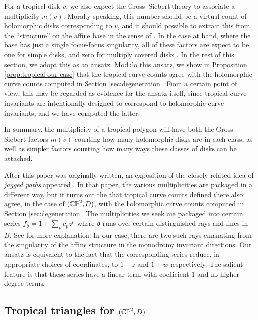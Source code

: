 \documentclass[12pt]{amsart}
\begin{document}
For a tropical disk $v$, we also expect the Gross--Siebert theory
to associate a multiplicity $m(v)$. Morally speaking, this number should be a virtual count of
holomorphic disks corresponding to $v$, and it should possible to extract this from the ``structure'' on the affine base in the sense of \cite{gs-affine-complex}. In the case at hand, where the base has just a single focus-focus singularity, all of these factors are expect to be one for simple disks, and zero for multiply covered disks \cite{abouzaid-comm}. In the rest of this section, we adopt this as an ansatz. Modulo this ansatz, we show in Proposition \ref{prop:tropical-our-case} that the tropical curve counts agree with the holomorphic curve counts computed in Section \ref{sec:degeneration}. From a certain point of view, this may be regarded as evidence for the ansatz itself, since tropical curve invariants are intentionally designed to correspond to holomorphic curve invariants, and we have computed the latter.

In summary, the multiplicity of a tropical polygon will have both the
Gross--Siebert factors $m(v)$ counting how many holomorphic disks are
in each class, as well as simpler factors counting how many ways these
classes of disks can be attached. 

\begin{remark}
  After this paper was originally written, an exposition of the closely related idea of \emph{jagged paths} appeared \cite[Definition 3.2]{gs-theta}. In that paper, the various multiplicities are packaged in a different way, but it turns out the that tropical curve counts defined there also agree, in the case of $(\mathbb{CP}^2,D)$, with the holomorphic curve counts computed in Section \ref{sec:degeneration}. The multiplicities we seek are packaged into certain series $f_{\mathfrak{d}} = 1 + \sum_p c_pz^p$ where $\mathfrak{d}$ runs over certain distinguished rays and lines in $B$. See \cite[\S 3]{gs-theta} for more explanation. In our case, there are two such rays emanating from the singularity of the affine structure in the monodromy invariant directions. Our ansatz is equivalent to the fact that the corresponding series reduce, in appropriate choices of coordinates, to $1 + z$ and $1+w$ respectively. The salient feature is that these series have a linear term with coefficient $1$ and no higher degree terms.
\end{remark}

\subsection{Tropical triangles for $(\mathbb{CP}^2, D)$}
\label{sec:tropical-our-case}
\end{document}
